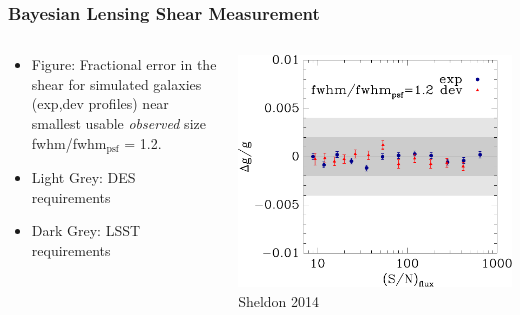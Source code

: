 \documentclass{beamer}
\begin{document}


\frame
{
    \frametitle{Bayesian Lensing Shear Measurement}

    \begin{columns}
        \begin{column}{0.4\textwidth}
            \begin{itemize}

                \item Figure: Fractional error in the shear for simulated galaxies
                    (exp,dev profiles) near smallest usable {\it observed} size
                    fwhm/fwhm$_{\textrm{psf}}$ = 1.2.

                \item Light Grey: DES requirements
                \item Dark Grey: LSST requirements
            \end{itemize}
        \end{column}
        \begin{column}{0.6\textwidth}
            \begin{center}
                \includegraphics[width=\textwidth]{ngmix-flux-s2n-sigrat-20.pdf}
                \newline
                Sheldon 2014
            \end{center}
        \end{column}
    \end{columns}

}
\end{document}
